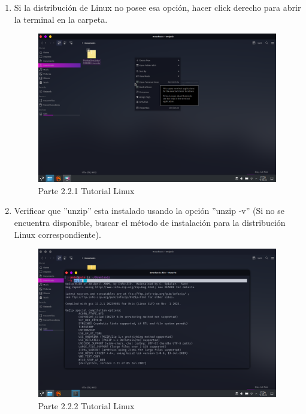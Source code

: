 \begin{enumerate}[label=\arabic*.-]
    \item Si la distribución de Linux no posee esa opción, hacer click derecho para abrir la terminal en la carpeta.
\begin{figure}[ht]
    \centering
    \includegraphics[width=10.5cm]{figures/TutorialLinux/tutoriallinux (3).png}
    \caption{Parte 2.2.1 Tutorial Linux}
    \label{fig:tutolinux3}
\end{figure}

    \item Verificar que ''unzip'' esta instalado usando la opción ''unzip -v'' (Si no se encuentra disponible, buscar el método de instalación para la distribución Linux correspondiente).
\begin{figure}[ht]
    \centering
    \includegraphics[width=10.5cm]{figures/TutorialLinux/tutoriallinux (4).png}
    \caption{Parte 2.2.2 Tutorial Linux}
    \label{fig:tutolinux4}
\end{figure}
\clearpage


\end{enumerate}

